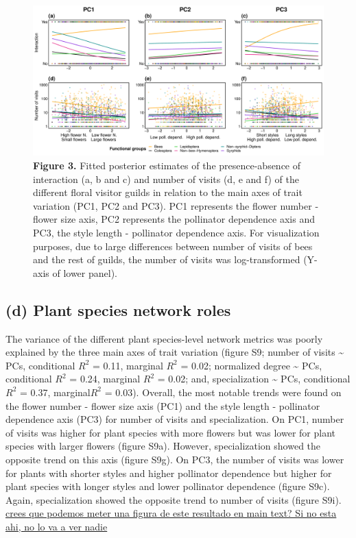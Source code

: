 \documentclass[
  12pt,
  a4paper,
]{article}
\newcommand{\blandscape}{\begin{landscape}}
\newcommand{\elandscape}{\end{landscape}}
\begin{document}
\vspace{5mm}
\blandscape

\begin{figure}
\centering
\includegraphics{output/figures/unnamed-chunk-4-1.pdf}
\caption{\label{fig:unnamed-chunk-4}\textbf{Figure 3.} Fitted posterior estimates of the presence-absence of interaction (a, b and c) and number of visits (d, e and f) of the different floral visitor guilds in relation to the main axes of trait variation (PC1, PC2 and PC3). PC1 represents the flower number - flower size axis, PC2 represents the pollinator dependence axis and PC3, the style length - pollinator dependence axis. For visualization purposes, due to large differences between number of visits of bees and the rest of guilds, the number of visits was log-transformed (Y-axis of lower panel).}
\end{figure}

\elandscape

\hypertarget{d-plant-species-network-roles}{%
\subsection{(d) Plant species network roles}\label{d-plant-species-network-roles}}

The variance of the different plant species-level network metrics was poorly explained by the three main axes of trait variation (figure S9; number of visits \textasciitilde{} PCs, conditional \(R^{2}\) = 0.11, marginal \(R^{2}\) = 0.02; normalized degree \textasciitilde{} PCs, conditional \(R^{2}\) = 0.24, marginal \(R^{2}\) = 0.02; and, specialization \textasciitilde{} PCs, conditional \(R^{2}\) = 0.37, marginal\(R^{2}\) = 0.03). Overall, the most notable trends were found on the flower number - flower size axis (PC1) and the style length - pollinator dependence axis (PC3) for number of visits and specialization. On PC1, number of visits was higher for plant species with more flowers but was lower for plant species with larger flowers (figure S9a). However, specialization showed the opposite trend on this axis (figure S9g). On PC3, the number of visits was lower for plants with shorter styles and higher pollinator dependence but higher for plant species with longer styles and lower pollinator dependence (figure S9c). Again, specialization showed the opposite trend to number of visits (figure S9i). \href{}{crees que podemos meter una figura de este resultado en main text? Si no esta ahi, no lo va a ver nadie}
\end{document}
